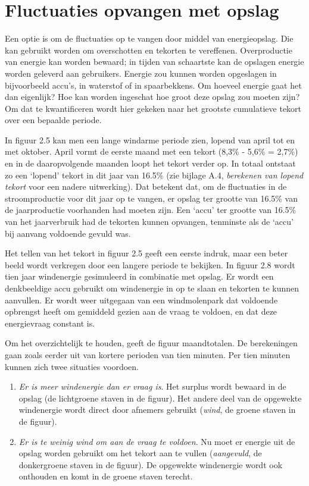 \documentclass[
  11pt,
  a4paper,
]{book}
\providecommand{\tightlist}{%
  \setlength{\itemsep}{0pt}\setlength{\parskip}{0pt}}
\begin{document}
\hypertarget{fluctuaties-opvangen-met-opslag}{%
\section{Fluctuaties opvangen met opslag}\label{fluctuaties-opvangen-met-opslag}}

Een optie is om de fluctuaties op te vangen door middel van energieopslag. Die kan gebruikt worden om overschotten en tekorten te vereffenen. Overproductie van energie kan worden bewaard; in tijden van schaartste kan de opslagen energie worden geleverd aan gebruikers. Energie zou kunnen worden opgeslagen in bijvoorbeeld accu's, in waterstof of in spaarbekkens. Om hoeveel energie gaat het dan eigenlijk? Hoe kan worden ingeschat hoe groot deze opslag zou moeten zijn? Om dat te kwantificeren wordt hier gekeken naar het grootste cumulatieve tekort over een bepaalde periode.

In figuur 2.5 kan men een lange windarme periode zien, lopend van april tot en met oktober. April vormt de eerste maand met een tekort (8,3\% - 5,6\% = 2,7\%) en in de daaropvolgende maanden loopt het tekort verder op. In totaal ontstaat zo een `lopend' tekort in dit jaar van 16.5\% (zie bijlage A.4,
\emph{berekenen van lopend tekort} voor een nadere uitwerking). Dat betekent dat, om de fluctuaties in de stroomproductie voor dit jaar op te vangen, er opslag ter grootte van 16.5\% van de jaarproductie voorhanden had moeten zijn. Een `accu' ter grootte van 16.5\% van het jaarverbruik had de tekorten kunnen opvangen, tenminste als de `accu' bij aanvang voldoende gevuld was.

Het tellen van het tekort in figuur 2.5 geeft een eerste indruk, maar een beter beeld wordt verkregen door een langere periode te bekijken. In figuur 2.8 wordt tien jaar windenergie gesimuleerd in combinatie met opslag. Er wordt een denkbeeldige accu gebruikt om windenergie in op te slaan en tekorten te kunnen aanvullen. Er wordt weer uitgegaan van een windmolenpark dat voldoende opbrengst heeft om gemiddeld gezien aan de vraag te voldoen, en dat deze energievraag constant is.

Om het overzichtelijk te houden, geeft de figuur maandtotalen. De berekeningen gaan zoals eerder uit van kortere perioden van tien minuten. Per tien minuten kunnen zich twee situaties voordoen.

\begin{enumerate}
\def\labelenumi{\arabic{enumi}.}
\tightlist
\item
  \emph{Er is meer windenergie dan er vraag is}. Het surplus wordt bewaard
  in de opslag (de lichtgroene staven in de figuur). Het andere deel
  van de opgewekte windenergie wordt direct door afnemers gebruikt (\emph{wind}, de groene staven in de figuur).
\item
  \emph{Er is te weinig wind om aan de vraag te voldoen}. Nu moet er
  energie uit de opslag worden gebruikt om het tekort aan te vullen
  (\emph{aangevuld}, de donkergroene staven in de figuur). De opgewekte
  windenergie wordt ook onthouden en komt in de groene staven terecht.
\end{enumerate}
\end{document}
